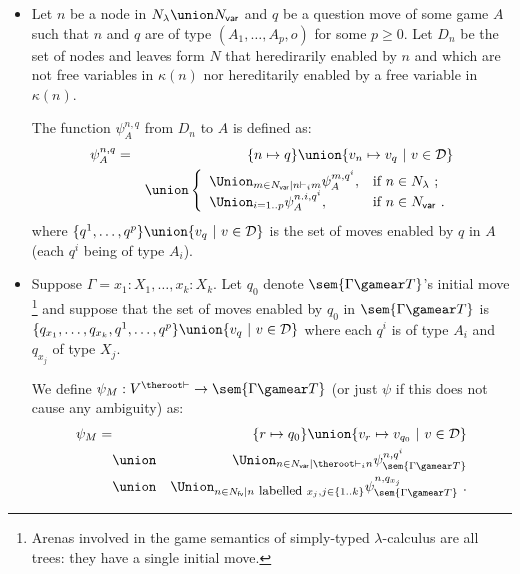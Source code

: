 \begin{definition}\hfill
\label{def:psi mapping}

    \begin{itemize}[-]
    \item Let $n$ be a node in $N_\lambda \union N_{\sf var}$ and $q$ be a question move of some game $A$
such that $n$ and $q$ are of type $(A_1,\ldots,A_p,o)$ for some
$p\geq 0$. Let $D_n$ be the set of nodes and leaves form $N$
that heredirarily enabled by $n$ and which are not free
variables in $\kappa(n)$ nor hereditarily enabled by a free
variable in $\kappa(n)$.

The function $\psi^{n,q}_A$ from $D_n$ to $A$ is defined as:
        \begin{eqnarray*}
        \psi^{n,q}_A &=& \{ n \mapsto q \} \union  \{ v_n \mapsto v_q \ | \ v \in \mathcal{D} \}\\
         &&\union \left\{
                        \begin{array}{ll}
                          \Union_{m \in N_{\sf var} | n \vdash_i m} \psi^{m, q^i}_A, & \hbox{if $n\in N_{\lambda}$\ ;} \\
                          \Union_{i=1..p} \psi^{n.i, q^i}_A, & \hbox{if $n\in N_{\sf var}$\ .}
                        \end{array}
                      \right.
        \end{eqnarray*}
        where $\{ q^1, \ldots, q^p \} \union \{ v_q \ | \ v \in \mathcal{D} \}$ is the set of moves enabled by $q$ in $A$ (each $q^i$ being of type $A_i$).

    \item Suppose $\Gamma = x_1:X_1, \ldots ,
    x_k:X_k$. Let $q_0$ denote $\sem{\Gamma\gamear T}$'s
    initial move \footnote{Arenas involved in the game semantics
    of simply-typed $\lambda$-calculus are all trees: they have
    a single initial move.} and suppose that the set of moves
    enabled by $q_0$ in $\sem{\Gamma\gamear T}$ is
     $\{ q_{x_1}, \ldots, q_{x_k}, q^1, \ldots, q^p \} \union \{
    v_q \ | \ v \in \mathcal{D} \}$ where each $q^i$ is of type
    $A_i$ and $q_{x_j}$ of type $X_j$.

    We define $\psi_M : V^{\theroot\vdash} \rightarrow
    \sem{\Gamma\gamear T}$ (or just $\psi$ if this does not
    cause any ambiguity) as:
    \begin{eqnarray*}
     \psi_M = && \{ r \mapsto q_0 \}  \union  \{ v_r \mapsto v_{q_0} \ | \ v \in \mathcal{D} \}\\
& \union& \Union_{n \in N_{\sf var} | \theroot\vdash_i n} \psi^{n, q^i}_\sem{\Gamma\gamear T} \\
& \union& \Union_{n \in N_{\sf fv} | n \mbox{ \small labelled } x_j, j \in \{ 1..k \} } \psi^{n, q_{x_j}}_\sem{\Gamma\gamear T} \ .
    \end{eqnarray*}
    \end{itemize}
\end{definition}

